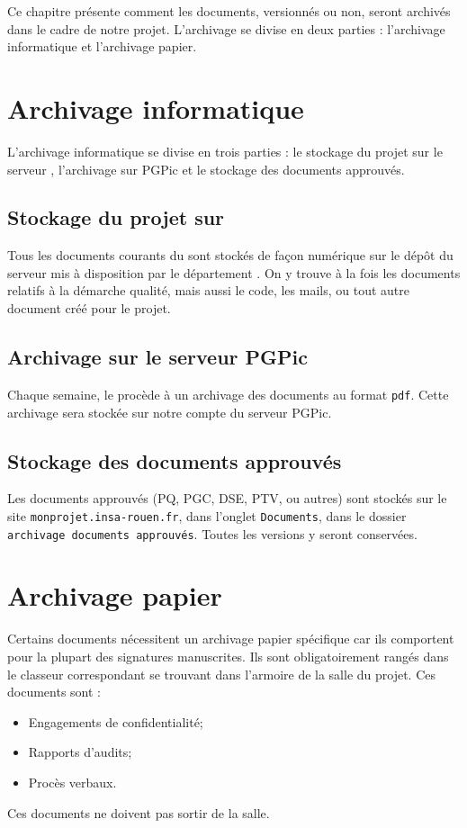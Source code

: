 
Ce chapitre présente comment les documents, versionnés ou non, seront archivés dans le cadre de notre projet. L’archivage se divise en deux parties : l’archivage informatique et l’archivage papier.

\section{Archivage informatique}
L'archivage informatique se divise en trois parties : le stockage du projet sur le serveur \git{}, l'archivage sur PGPic et le stockage des documents approuvés.

\subsection{Stockage du projet sur \git{}}
Tous les documents courants du \PICCourt sont stockés de façon numérique sur le dépôt du serveur \git{} mis à disposition par le département \ASI{}. On y trouve à la fois les documents relatifs à la démarche qualité, mais aussi le code, les mails, ou tout autre document créé pour le projet.

\subsection{Archivage sur le serveur PGPic}

Chaque semaine, le \RQ{} procède à un archivage des documents au format \verb+pdf+. Cette archivage sera stockée sur notre compte du serveur PGPic.

\subsection{Stockage des documents approuvés}

Les documents approuvés (PQ, PGC, DSE, PTV, ou autres) sont stockés sur le site \verb+monprojet.insa-rouen.fr+, dans l'onglet \verb+Documents+, dans le dossier \verb+archivage documents approuvés+. Toutes les versions y seront conservées.

\section{Archivage papier}
Certains documents nécessitent un archivage papier spécifique car ils comportent pour la plupart des signatures manuscrites. Ils sont obligatoirement rangés dans le classeur correspondant se trouvant dans l’armoire de la salle du projet. Ces documents sont :
\begin{itemize}
\item Engagements de confidentialité;
\item Rapports d’audits;
\item Procès verbaux.
\end{itemize}
Ces documents ne doivent pas sortir de la salle.
